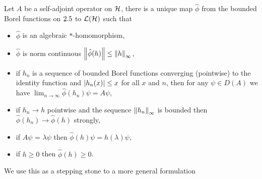 \begin{thm}\label{thm:spectral-sa-ops-bounded-functions}
    Let $A$ be a self-adjoint operator on $\mathcal{H}$, there is a unique map $\hat{\phi}$ from the bounded Borel functions on $2.5$ to $\bops[\hcal]$ such that
    \begin{itemize}
      \item $\hat{\phi}$ is an algebraic $*$-homomorphism,
      \item $\hat{\phi}$ is norm continuous ${\left\lVert{\hat{\phi}(h)}\right\rVert} \leq {\left\lVert{h}\right\rVert}_\infty$,
      \item if $h_n$ is a sequence of bounded Borel functions converging (pointwise) to the identity function and ${\left\lvert{h_n(x)}\right\rvert} \leq x$ for all $x$ and $n$, then for any $\psi\in D(A)$ we have $\lim_{n\to\infty} \hat{\phi}(h_n)\psi = A\psi$,
      \item if $h_n \to h$ pointwise and the sequence ${\left\lVert{h_n}\right\rVert}_\infty$ is bounded then $\hat{\phi}(h_n) \to \hat{\phi}(h)$ strongly,
      \item if $A\psi$ = $\lambda\psi$ then $\hat{\phi}(h)\psi = h(\lambda)\psi$,
      \item if $h\geq 0$ then $\hat{\phi}(h) \geq 0$.
    \end{itemize}
\end{thm}

We use this as a stepping stone to a more general formulation

